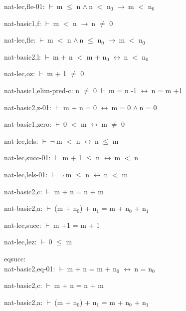 \documentclass[a4paper]{article}
\newcommand{\Fol}{\mbox{$\vdash\ $}}
\newcommand{\Not}{\mbox{$\neg\ $}}
\newcommand{\And}{\mbox{$\wedge\ $}}
\newcommand{\Imp}{\mbox{$\rightarrow\ $}}
\newcommand{\Equiv}{\mbox{$\leftrightarrow\ $}}
\begin{document}
nat-lec,fle-01: 
 \Fol m $\le$ n \And n $<$ $\mbox{n}_{0}$ \Imp m $<$ $\mbox{n}_{0}$



nat-basic1,f: 
 \Fol m $<$ n \Imp n $\neq$ 0



nat-lec,fle: 
 \Fol m $<$ n \And n $\le$ $\mbox{n}_{0}$ \Imp m $<$ $\mbox{n}_{0}$



nat-basic2,l: 
 \Fol m + n $<$ m + $\mbox{n}_{0}$ \Equiv n $<$ $\mbox{n}_{0}$



nat-lec,oz: 
 \Fol m + 1 $\neq$ 0



nat-basic1,elim-pred-c: 
n $\neq$ 0
 \Fol m = n -1 \Equiv n = m +1



nat-basic2,z-01: 
 \Fol m + n = 0 \Equiv m = 0 \And n = 0



nat-basic1,zero: 
 \Fol 0 $<$ m \Equiv m $\neq$ 0



nat-lec,lels: 
 \Fol \Not m $<$ n \Equiv n $\le$ m



nat-lec,succ-01: 
 \Fol m + 1 $\le$ n \Equiv m $<$ n



nat-lec,lels-01: 
 \Fol \Not m $\le$ n \Equiv n $<$ m



nat-basic2,c: 
 \Fol m + n = n + m



nat-basic2,a: 
 \Fol (m + $\mbox{n}_{0}$) + $\mbox{n}_{1}$ = m + $\mbox{n}_{0}$ + $\mbox{n}_{1}$



nat-lec,succ: 
 \Fol m +1 = m + 1



nat-lec,lez: 
 \Fol 0 $\le$ m



\bigskip

eqsucc:\\ nat-basic2,eq-01: 
 \Fol m + n = m + $\mbox{n}_{0}$ \Equiv n = $\mbox{n}_{0}$



nat-basic2,c: 
 \Fol m + n = n + m



nat-basic2,a: 
 \Fol (m + $\mbox{n}_{0}$) + $\mbox{n}_{1}$ = m + $\mbox{n}_{0}$ + $\mbox{n}_{1}$
\end{document}

